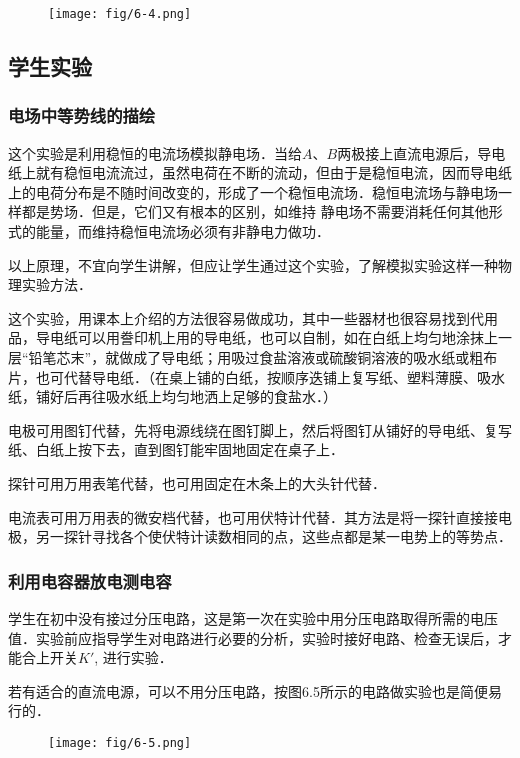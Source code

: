 \begin{figure}[htp]
    \centering
   \texttt{[image: fig/6-4.png]}
    \caption{}
\end{figure}

\subsection{学生实验}
\subsubsection{电场中等势线的描绘}

这个实验是利用稳恒的电流场模拟静电场．当给$A$、$B$两极接上直流电源后，导电纸上就有稳恒电流流过，虽然电荷在不断的流动，但由于是稳恒电流，因而导电纸上的电荷分布是不随时间改变的，形成了一个稳恒电流场．稳恒电流场与静电场一样都是势场．但是，它们又有根本的区别，如维持
静电场不需要消耗任何其他形式的能量，而维持稳恒电流场必须有非静电力做功．

以上原理，不宜向学生讲解，但应让学生通过这个实验，了解模拟实验这样一种物理实验方法．

这个实验，用课本上介绍的方法很容易做成功，其中一些器材也很容易找到代用品，导电纸可以用誊印机上用的导电纸，也可以自制，如在白纸上均匀地涂抹上一层“铅笔芯末”，就做成了导电纸；用吸过食盐溶液或硫酸铜溶液的吸水纸或粗布片，也可代替导电纸．（在桌上铺的白纸，按顺序迭铺上复写纸、塑料薄膜、吸水纸，铺好后再往吸水纸上均匀地洒上足够的食盐水．）

电极可用图钉代替，先将电源线绕在图钉脚上，然后将图钉从铺好的导电纸、复写纸、白纸上按下去，直到图钉能牢固地固定在桌子上．

探针可用万用表笔代替，也可用固定在木条上的大头针代替．

电流表可用万用表的微安档代替，也可用伏特计代替．其方法是将一探针直接接电极，另一探针寻找各个使伏特计读数相同的点，这些点都是某一电势上的等势点．

\subsubsection{利用电容器放电测电容}

学生在初中没有接过分压电路，这是第一次在实验中用分压电路取得所需的电压值．实验前应指导学生对电路进行必要的分析，实验时接好电路、检查无误后，才能合上开关$K'$, 进行实验．

若有适合的直流电源，可以不用分压电路，按图6.5所示的电路做实验也是简便易行的．

\begin{figure}[htp]
    \centering
    \texttt{[image: fig/6-5.png]}
    \caption{}
\end{figure}

